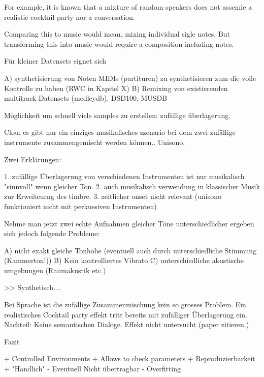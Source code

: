 For example, it is known that a mixture of random speakers does not assemle a realistic cocktail party nor a conversation.

Comparing this to music would mean, mixing individual sigle notes. But transforming this into music would require a composition including notes.

Für kleiner Datensets eignet sich

A) synthetisierung von Noten MIDIs (partituren) zu synthetisieren zum die volle Kontrolle zu haben (RWC in Kapitel X)
B) Remixing von existierenden multitrack Datensets (medleydb). DSD100, MUSDB

Möglichkeit um schnell viele samples zu erstellen: zufällige überlagerung.

Clou: es gibt nur ein einziges musikalisches szenario bei dem zwei zufällige instrumente zusammengemischt werden können.. Unisono.

Zwei Erklärungen:

1. zufällige Überlagerung von verschiedenen Instrumenten ist nur musikalisch "sinnvoll" wenn gleicher Ton.
2. auch musikalisch verwendung in klassischer Musik zur Erweiteurng des timbre.
3. zeitlicher onset nicht relevant (unisono funktioniert nicht mit perkussiven Instrumenten)

Nehme man jetzt zwei echte Aufnahmen gleicher Töne unterschiedlicher ergeben sich jedoch folgende Probleme:

A) nicht exakt gleiche Tonhöhe (eventuell auch durch unterschiedliche Stimmung (Kammerton!))
B) Kein kontrolliertes Vibrato
C) unterschiedliche akustische umgebungen (Raumakustik etc.)

>> Synthetisch....

Bei Sprache ist die zufällige Zusammenmischung kein so grosses Problem. Ein realistisches Cocktail party effekt tritt bereits mit zufälliger Überlagerung ein. Nachteil: Keine semantischen Dialoge. Effekt nicht untersucht (paper zitieren.)

Fazit

+ Controlled Environments
+ Allows to check parameters
+ Reproduzierbarkeit
+ "Handlich"
- Eventuell Nicht übertragbar
- Overfitting

